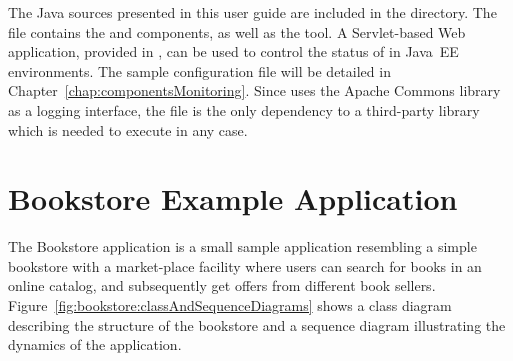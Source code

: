 The Java sources presented in this user guide are included in the \file{\exampleDir/} directory. The file \file{\mainJar{}} contains the \KiekerMonitoringPart{} and \KiekerAnalysisPart{} components, as well as the \KiekerTraceAnalysis{} tool. A Servlet-based Web application, provided in \file{\servletWar}, can be used to control the status of \KiekerMonitoringPart{} in Java~EE environments. The sample \KiekerMonitoringPart{} 
configuration file %
\file{\kiekerMonitoringProperties{}} will be detailed in Chapter~\ref{chap:componentsMonitoring}. Since \Kieker{} uses the Apache Commons library~\cite{CommonsLogging-WebSite} as a logging interface, the file \file{\commonsLoggingJar} is the only dependency to a third-party library which is needed to execute \Kieker{} in any case. 

\section{Bookstore Example Application}\label{sec:example:bookstore}

The Bookstore application is a small sample application resembling a simple bookstore with a market-place facility where users can search for books in an online catalog, and subsequently get offers from different book sellers. 
Figure~\ref{fig:bookstore:classAndSequenceDiagrams} shows a class diagram describing the structure of the bookstore and a sequence diagram illustrating the dynamics of the application. 

